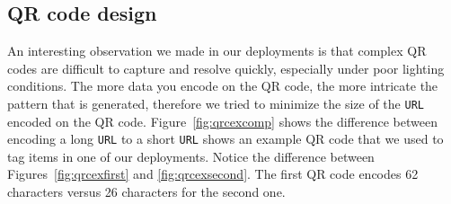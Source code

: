 
\subsection{QR code design}
\label{sec:qrcodedesign}

An interesting observation we made in our deployments is that complex QR codes are difficult to capture and resolve
quickly, especially under poor lighting conditions.
The more data you encode on the QR code, the more 
intricate the pattern that is generated, therefore we tried to minimize the size of the {\tt URL} encoded on the QR code.  
Figure~\ref{fig:qrcexcomp} shows the difference between encoding a 
long %
{\tt URL} to a short {\tt URL} shows an %
example QR code that we used to tag items in one of our deployments.  Notice the difference between Figures~\ref{fig:qrcexfirst} 
and \ref{fig:qrcexsecond}.  The first QR code encodes 62 characters versus 26 characters for the second one.

